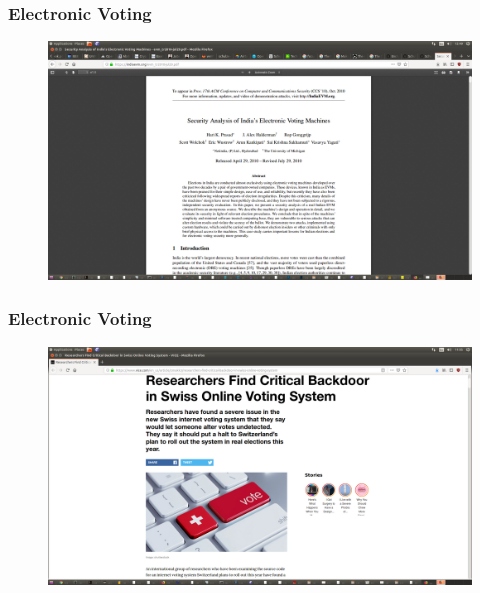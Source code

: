 \documentclass{beamer}
\begin{document}
\begin{frame}
\frametitle{Electronic Voting}
\begin{figure}
\includegraphics[scale=0.20]{Indiavote.png}
\end{figure}
\end{frame}


\begin{frame}
\frametitle{Electronic Voting}
\begin{figure}
\includegraphics[scale=0.20]{swisspost.png}
\end{figure}
\end{frame}
\end{document}

